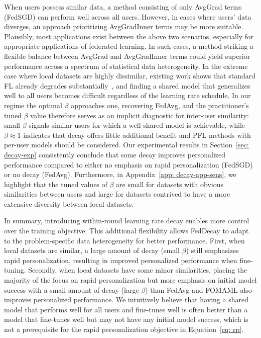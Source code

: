 When users possess similar data, a method consisting of only AvgGrad terms (FedSGD) can perform well across all users.
However, in cases where users' data diverges, an approach prioritizing AvgGradInner terms may be more suitable.
Plausibly, most applications exist between the above two scenarios, especially for appropriate applications of federated learning.
In such cases, a method striking a flexible balance between AvgGrad and AvgGradInner terms could yield superior performance across a spectrum of statistical data heterogeneity.
In the extreme case where local datasets are highly dissimilar, existing work shows that standard FL already degrades substantially~\citep{fl-noniid}, and finding a shared model that generalizes well to all users becomes difficult regardless of the learning rate schedule.
In our regime the optimal $\beta$ approaches one, recovering FedAvg, and the practitioner's tuned $\beta$ value therefore serves as an implicit diagnostic for inter-user similarity: small $\beta$ signals similar users for which a well-shared model is achievable, while $\beta \approx 1$ indicates that decay offers little additional benefit and PFL methods with per-user models should be considered.
Our experimental results in Section~\ref{sec: decay-exp} consistently conclude that some decay improves personalized performance compared to either no emphasis on rapid personalization (FedSGD) or no decay (FedAvg).
Furthermore, in Appendix~\ref{app: decay-app-sens}, we highlight that the tuned values of $\beta$ are small for datasets with obvious similarities between users and large for datasets contrived to have a more extensive diversity between local datasets.

In summary, introducing within-round learning rate decay enables more control over the training objective. 
This additional flexibility allows FedDecay to adapt to the problem-specific data heterogeneity for better performance. 
First, when local datasets are similar, a large amount of decay (small $\beta$) still emphasizes rapid personalization, resulting in improved personalized performance when fine-tuning. 
Secondly, when local datasets have some minor similarities, placing the majority of the focus on rapid personalization but more emphasis on initial model success with a small amount of decay (large $\beta$) than FedAvg and FOMAML also improves personalized performance. 
We intuitively believe that having a shared model that performs well for all users and fine-tunes well is often better than a model that fine-tunes well but may not have any initial model success, which is not a prerequisite for the rapid personalization objective in Equation~\ref{eq: rp}. 

